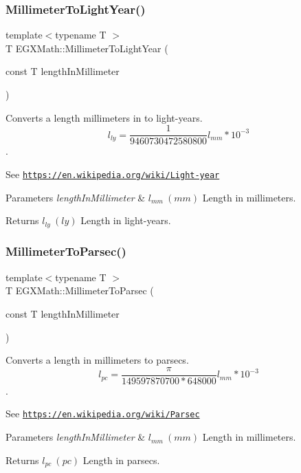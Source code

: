 \subsubsection{\texorpdfstring{Millimeter\+To\+Light\+Year()}{MillimeterToLightYear()}}
{\footnotesize\ttfamily template$<$typename T $>$ \\
T E\+G\+X\+Math\+::\+Millimeter\+To\+Light\+Year (\begin{DoxyParamCaption}\item[{const T}]{length\+In\+Millimeter }\end{DoxyParamCaption})}



Converts a length millimeters in to light-\/years. \[ l_{ly}= \frac{1}{9460730472580800} l_{mm} * 10^{-3} \]. 

See \href{https://en.wikipedia.org/wiki/Light-year}{\tt https\+://en.\+wikipedia.\+org/wiki/\+Light-\/year} 
\begin{DoxyParams}{Parameters}
{\em length\+In\+Millimeter} & $ l_{mm}\ (mm)$ Length in millimeters. \\
\hline
\end{DoxyParams}
\begin{DoxyReturn}{Returns}
$ l_{ly}\ (ly)$ Length in light-\/years. 
\end{DoxyReturn}
\mbox{\label{group___e_g_x_math-_conversions-_length_conversions-_s_i-_millimeter-_astronomical_ga55cf82aa51af1d469ae58cc5d03570f7}} 
\subsubsection{\texorpdfstring{Millimeter\+To\+Parsec()}{MillimeterToParsec()}}
{\footnotesize\ttfamily template$<$typename T $>$ \\
T E\+G\+X\+Math\+::\+Millimeter\+To\+Parsec (\begin{DoxyParamCaption}\item[{const T}]{length\+In\+Millimeter }\end{DoxyParamCaption})}



Converts a length in millimeters to parsecs. \[ l_{pc}=\frac{\pi}{149597870700 * 648000} l_{mm} * 10^{-3} \]. 

See \href{https://en.wikipedia.org/wiki/Parsec}{\tt https\+://en.\+wikipedia.\+org/wiki/\+Parsec} 
\begin{DoxyParams}{Parameters}
{\em length\+In\+Millimeter} & $ l_{mm}\ (mm)$ Length in millimeters. \\
\hline
\end{DoxyParams}
\begin{DoxyReturn}{Returns}
$ l_{pc}\ (pc)$ Length in parsecs. 
\end{DoxyReturn}
